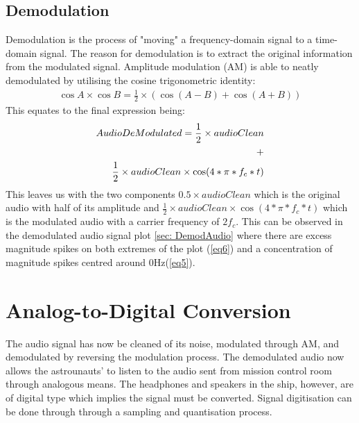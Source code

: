 \documentclass{article}
\begin{document}
\subsection{Demodulation}
Demodulation is the process of "moving" a frequency-domain signal to a time-domain signal. The reason for demodulation is to extract the original information from the modulated signal. Amplitude modulation (AM) is able to neatly demodulated by utilising the cosine trigonometric identity:
\begin{align}
\cos A\times \cos B= \frac{1}{2}\times\left(\cos(A-B)+\cos(A+B)\right)
\end{align}
This equates to the final expression being:
\begin{align}
    AudioDeModulated = \frac{1}{2}  \times audioClean \label{eq5}\\
    +\\
    \raggedright
    \frac{1}{2} \times audioClean \times \cos(4*\pi*f_{c}*t) \label{eq6}
\end{align}
This leaves us with the two components $0.5 \times audioClean$ which is the original audio with half of its amplitude and $\frac{1}{2}  \times audioClean \times \cos(4*\pi*f_{c}*t)$ which is the modulated audio with a carrier frequency of $2f_{c}$. This can be  observed in the demodulated audio signal plot \ref{sec: DemodAudio} where there are excess magnitude spikes on both extremes of the plot (\ref{eq6}) and a concentration of magnitude spikes centred around 0Hz(\ref{eq5}).
\section{Analog-to-Digital Conversion}
The audio signal has now be cleaned of its noise, modulated through AM, and demodulated by reversing the modulation process. The demodulated audio now allows the astrounauts' to listen to the audio sent from mission control room through analogous means. The headphones and speakers in the ship, however, are of digital type which implies the signal must be converted. Signal digitisation can be done through through a sampling and quantisation process.
\end{document}
